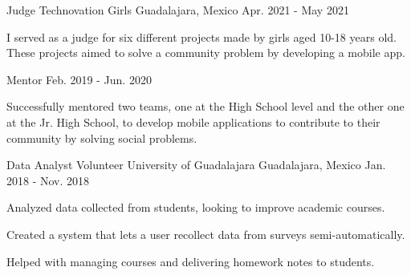 \begin{cventries}
  \cventry
    {Judge} %
    {Technovation Girls} %
    {Guadalajara, Mexico} %
    {Apr. 2021 - May 2021} %
    {
      \begin{cvitems} %
        \item {I served as a judge for six different projects made by girls aged 10-18 years old. These projects aimed to solve a community problem by developing a mobile app.}
      \end{cvitems}
    }
    
  \cventry
    {Mentor} %
    {} %
    {} %
    {Feb. 2019 - Jun. 2020} %
    {
      \begin{cvitems} %
        \item {Successfully mentored two teams, one at the High School level and the other one at the Jr. High School, to develop mobile applications to contribute to their community by solving social problems.}
      \end{cvitems}
    }
    
  \cventry
    {Data Analyst Volunteer} %
    {University of Guadalajara} %
    {Guadalajara, Mexico} %
    {Jan. 2018 - Nov. 2018} %
    {
      \begin{cvitems} %
        \item {Analyzed data collected from students, looking to improve academic courses.}
        \item {Created a system that lets a user recollect data from surveys semi-automatically.}
        \item {Helped with managing courses and delivering homework notes to students.}
      \end{cvitems}
    }

\end{cventries}
